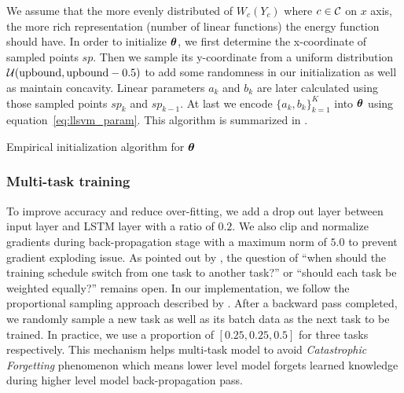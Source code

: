 \documentclass[sigconf,anonymous,review]{acmart}
\renewcommand{\citename}{\citet}
\begin{document}
We assume that the more evenly distributed of $W_c(Y_c)$ where
$c\in\cal C$ on $x$ axis, the more rich representation (number of
linear functions) the energy function should have. In order to
initialize $\boldsymbol{\theta}$, we first determine the x-coordinate of
sampled points $sp$. Then we sample its y-coordinate from a
uniform distribution ${\cal U}(\text{upbound},\text{upbound}-0.5)$ to add some
randomness in our initialization as well as maintain concavity.
Linear parameters $a_k$ and $b_k$ are later calculated using
those sampled points $sp_k$ and $sp_{k-1}$. At last we encode
$\{a_k,b_k\}_{k=1}^K$ into $\boldsymbol{\theta}$ using
equation~\eqref{eq:llsvm_param}. This algorithm is summarized in
.

\begin{algorithm}[h]
  \begin{algorithmic}[1]
       
    \ENDIF
    \ENDFOR
     
  \end{algorithmic}
  \caption{\label{alg:init_theta} Empirical initialization
    algorithm for $\boldsymbol{\theta}$}
\end{algorithm}

\subsubsection{Multi-task training}
\label{sec:multi_train}

To improve accuracy and reduce over-fitting, we add a drop out
layer between input layer and LSTM layer with a ratio of $0.2$.
We also clip and normalize gradients during back-propagation
stage with a maximum norm of $5.0$ to prevent gradient exploding
issue. As pointed out by \citename{lample2016neural}, the
question of ``when should the training schedule switch from one
task to another task?'' or ``should each task be weighted
equally?'' remains open. In our implementation, we follow the
proportional sampling approach described by
\citename{sogaard2016deep}. After a backward pass completed, we
randomly sample a new task as well as its batch data as the next
task to be trained. In practice, we use a proportion of
$[0.25,0.25,0.5]$ for three tasks respectively. This mechanism
helps multi-task model to avoid \emph{Catastrophic Forgetting}
phenomenon which means lower level model forgets learned
knowledge during higher level model back-propagation pass.
\end{document}
